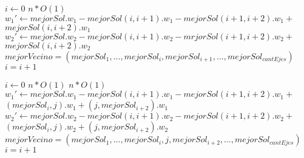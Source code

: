 \begin{flushleft}
 \begin{figure}[H]
  \begin{pseudo}
   \State $i \leftarrow 0$
   \hfill$n*O(1)$
	  \State $w_1' \leftarrow mejorSol.w_1 - mejorSol(i,i+1).w_1 - mejorSol(i+1,i+2).w_1 + $
	  \State$mejorSol(i,i+2).w_1$
	  \State $w_2' \leftarrow mejorSol.w_2 - mejorSol(i,i+1).w_2 - mrjorSol(i+1,i+2).w_2 + $
	  \State $mejorSol(i,i+2).w_2$
	    \State $mejorVecino = (mejorSol_1, ... ,mejorSol_i, mejorSol_{i+1}, ..., mejorSol_{cantEjes})$
	  \EndIf
      \EndIf
      \State $i = i+1$
   \EndWhile
   \EndProcedure
  \end{pseudo}
 \end{figure}
\end{flushleft}

\begin{flushleft}
 \begin{figure}[H]
  \begin{pseudo}
   \State $i \leftarrow 0$
   \hfill$n*O(1)$
      \hfill$n*O(1)$
	  \State $w_1' \leftarrow mejorSol.w_1 - mejorSol(i,i+1).w_1 - mejorSol(i+1,i+2).w_1 + $
	  \State $(mejorSol_i, j).w_1 + (j, mejorSol_{i+2}).w_1$
	  \State $w_2' \leftarrow mejorSol.w_2 - mejorSol(i,i+1).w_2 - mejorSol(i+1,i+2).w_2 + $
	  \State $(mejorSol_i, j).w_2 + (j, mejorSol_{i+2}).w_2$
	    \State $mejorVecino = (mejorSol_1, ... ,mejorSol_i, j ,mejorSol_{i+2}, ..., mejorSol_{cantEjes})$
	  \EndIf
      \EndFor
      \State $i = i+1$
   \EndWhile
   \EndProcedure
  \end{pseudo}
 \end{figure}
\end{flushleft}
